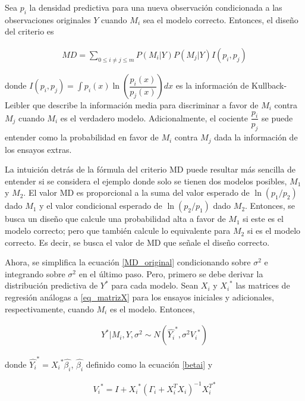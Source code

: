 Sea $p_i$ la densidad predictiva para una nueva observación condicionada a las observaciones originales $Y$ cuando $M_i$ sea el modelo correcto. Entonces, el diseño del criterio es 

\begin{equation} \label{MD_original}
	\begin{aligned}
		MD = \sum_{0 \leq i \neq j \leq m} P(M_i | Y)  P(M_j | Y) I(p_i, p_j)
	\end{aligned}
\end{equation}

\noindent donde $I(p_i, p_j) = \int p_i(x) \ln(\dfrac{p_i(x)}{p_j(x)}) dx$ es la información de Kullback-Leibler que describe la información media para discriminar a favor de $M_i$ contra $M_j$ cuando $M_i$ es el verdadero modelo. Adicionalmente, el cociente $\dfrac{p_i}{p_j}$ se puede entender como la probabilidad en favor de $M_i$ contra $M_j$ dada la información de los ensayos extras. 

La intuición detrás de la fórmula del criterio MD puede resultar más sencilla de entender si se considera el ejemplo donde solo se tienen dos modelos posibles, $M_1$ y $M_2$. El valor MD es proporcional a la suma del valor esperado de $\ln(p_1/p_2)$ dado $M_1$ y el valor condicional esperado de  $\ln(p_2/p_1)$ dado $M_2$. Entonces, se busca un diseño que calcule una probabilidad alta a favor de $M_1$ si este es el modelo correcto; pero que también calcule lo equivalente para $M_2$ si es el modelo correcto. Es decir, se busca el valor de MD que señale el diseño correcto. 

Ahora, se simplifica la ecuación \ref{MD_original} condicionando sobre $\sigma^{2}$ e integrando sobre $\sigma^{2}$ en el último paso. Pero, primero se debe derivar la distribución predictiva de $Y^{*}$ para cada modelo. Sean ${X_i}$ y ${X_i}^{*}$ las matrices de regresión análogas a \ref{eq_matrizX} para los ensayos iniciales y adicionales, respectivamente, cuando $M_i$ es el modelo. Entonces, 

\begin{equation*}
	\begin{aligned}
		Y^{*} | M_i, Y, \sigma^{2} \sim N(\hat{{Y_i}}^{*}, \sigma^{2} {V_i}^{*})
	\end{aligned}
\end{equation*}

\noindent donde $\hat{{Y_i}}^{*} = {X_i}^{*} \hat{\beta_i}$, $\hat{\beta_i}$ definido como la ecuación \ref{betai} y 

\begin{equation} \label{vi_vj}
	\begin{aligned}
	{V_i}^{*} = I + {X_i}^{*}(\Gamma_i + X_i^{T}X_i)^{-1} {X_i^{T}}^{*}
	\end{aligned}
\end{equation}

